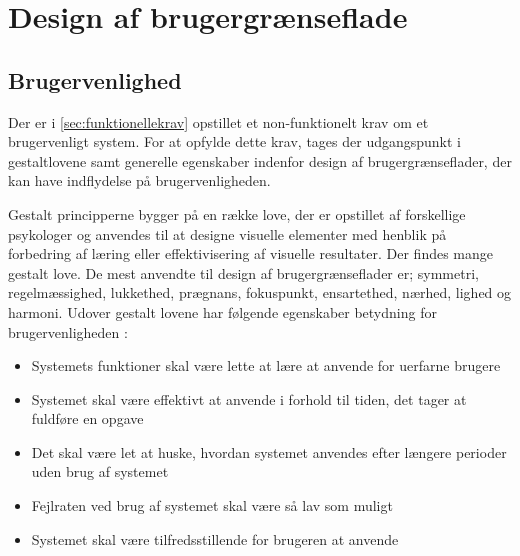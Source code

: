 \section{Design af brugergrænseflade}

\subsection{Brugervenlighed}
Der er i \autoref{sec:funktionellekrav} opstillet et non-funktionelt krav om et brugervenligt system. For at opfylde dette krav, tages der udgangspunkt i gestaltlovene samt generelle egenskaber indenfor design af brugergrænseflader, der kan have indflydelse på brugervenligheden. 

Gestalt principperne bygger på en række love, der er opstillet af forskellige psykologer og anvendes til at designe visuelle elementer med henblik på forbedring af læring eller effektivisering af visuelle resultater. Der findes mange gestalt love. De mest anvendte til design af brugergrænseflader er; symmetri, regelmæssighed, lukkethed, prægnans, fokuspunkt, ensartethed, nærhed, lighed og harmoni.\cite{Chang2002} Udover gestalt lovene har følgende egenskaber betydning for brugervenligheden \cite{ferre2001}:
\begin{itemize}
\item Systemets funktioner skal være lette at lære at anvende for uerfarne brugere
\item Systemet skal være effektivt at anvende i forhold til tiden, det tager at fuldføre en opgave
\item Det skal være let at huske, hvordan systemet anvendes efter længere perioder uden brug af systemet
\item Fejlraten ved brug af systemet skal være så lav som muligt
\item Systemet skal være tilfredsstillende for brugeren at anvende
\end{itemize}
 
 
